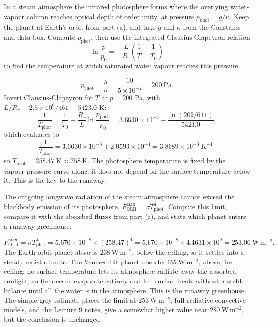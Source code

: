 \parti In a steam atmosphere the infrared photosphere forms where the overlying water-vapour column reaches optical depth of order unity,
at pressure $p_\mathrm{phot} = g/\kappa$.
Keep the planet at Earth's orbit from part (a), and take $g$ and $\kappa$ from the Constants and data box.
Compute $p_\mathrm{phot}$, then use the integrated Clausius-Clapeyron relation
\[
\ln\!\frac{p}{p_0} = -\frac{L}{R_v}\left(\frac{1}{T} - \frac{1}{T_0}\right)
\]
to find the temperature at which saturated water vapour reaches this pressure.

\begin{solution}
\[
p_\mathrm{phot} = \frac{g}{\kappa} = \frac{10}{5\times10^{-2}} = 200\ \mathrm{Pa}.
\]
Invert Clausius-Clapeyron for $T$ at $p = 200$ Pa, with $L/R_v = 2.5\times10^{6}/461 = 5423.0$ K:
\[
\frac{1}{T_\mathrm{phot}} = \frac{1}{T_0} - \frac{R_v}{L}\ln\!\frac{p_\mathrm{phot}}{p_0}
= 3.6630\times10^{-3} - \frac{\ln(200/611)}{5423.0},
\]
which evaluates to
\[
\frac{1}{T_\mathrm{phot}} = 3.6630\times10^{-3} + 2.0593\times10^{-4} = 3.8689\times10^{-3}\ \mathrm{K^{-1}},
\]
so $T_\mathrm{phot} = 258.47\ \mathrm{K} \approx 258\ \mathrm{K}$.
The photosphere temperature is fixed by the vapour-pressure curve alone: it does not depend on the surface temperature below it.
This is the key to the runaway.
\end{solution}

\parti The outgoing longwave radiation of the steam atmosphere cannot exceed the blackbody emission of its photosphere,
$F_\mathrm{OLR}^\mathrm{max} = \sigma T_\mathrm{phot}^4$.
Compute this limit,
compare it with the absorbed fluxes from part (a), and state which planet enters a runaway greenhouse.

\begin{solution}
\[
F_\mathrm{OLR}^\mathrm{max} = \sigma T_\mathrm{phot}^4
= 5.670\times10^{-8} \times (258.47)^4
= 5.670\times10^{-8} \times 4.4631\times10^{9} = 253.06\ \mathrm{W\,m^{-2}}.
\]
The Earth-orbit planet absorbs $238\ \mathrm{W\,m^{-2}}$, below the ceiling, so it settles into a steady moist climate.
The Venus-orbit planet absorbs $455\ \mathrm{W\,m^{-2}}$, above the ceiling:
no surface temperature lets its atmosphere radiate away the absorbed sunlight,
so the oceans evaporate entirely and the surface heats without a stable balance until all the water is in the atmosphere.
This is the runaway greenhouse.
The simple grey estimate places the limit at $253\ \mathrm{W\,m^{-2}}$;
full radiative-convective models, and the Lecture 9 notes, give a somewhat higher value near $280\ \mathrm{W\,m^{-2}}$,
but the conclusion is unchanged.
\end{solution}


